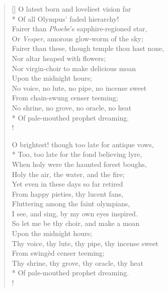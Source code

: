 \documentclass[MAIN]{subfiles}
\begin{document}
\begin{verse}[\versewidth]
O latest born and loveliest vision far\\*
\vin Of all {\sc Olympus}' faded hierarchy!\\
Fairer than \emph{Phoebe}'s sapphire-regioned star,\\ 
\vin Or \emph{Vesper}, amorous glow-worm of the sky;\\
Fairer than these, though temple thou hast none,\\
\vin \vin Nor altar heaped with flowers;\\
Nor virgin-choir to make delicious moan\\
\vin \vin Upon the midnight hours;\\
No voice, no lute, no pipe, no incense sweet\\
\vin From chain-swung censer teeming;\\
No shrine, no grove, no oracle, no heat\\*
\vin Of pale-mouthed prophet dreaming.\\!

O brightest! though too late for antique vows,\\*
\vin Too, too late for the fond believing lyre,\\
When holy were the haunted forest boughs,\\
\vin Holy the air, the water, and the fire;\\
Yet even in these days so far retired\\
\vin From happy pieties, thy lucent fans,\\
\vin Fluttering among the faint olympians,\\
I see, and sing, by my own eyes inspired.\\
So let me be thy choir, and make a moan\\
\vin \vin Upon the midnight hours;\\
Thy voice, thy lute, thy pipe, thy incense sweet\\
\vin From swing\`ed censer teeming;\\
Thy shrine, thy grove, thy oracle, thy heat\\*
\vin Of pale-mouthed prophet dreaming.\\!


\end{verse}
\end{document}

